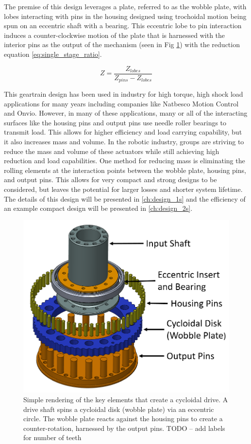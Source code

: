 The premise of this design leverages a plate, referred to as the wobble plate, with lobes interacting with pins in the housing designed using trochoidal motion being spun on an eccentric shaft with a bearing.
This eccentric lobe to pin interaction induces a counter-clockwise motion of the plate that is harnessed with the interior pins as the output of the mechanism (seen in Fig \ref{fig:cycloid_cartoon}) with the reduction equation \ref{eq:single_stage_ratio}.

\begin{equation} \label{eq:single_stage_ratio}
Z = \frac{Z_{lobes}} {Z_{pins} - Z_{lobes}}
\end{equation}

This geartrain design has been used in industry for high torque, high shock load applications for many years including companies like Natbesco Motion Control and Onvio.
However, in many of these applications, many or all of the interacting surfaces like the housing pins and output pins use needle roller bearings to transmit load.
This allows for higher efficiency and load carrying capability, but it also increases mass and volume.
In the robotic industry, groups are striving to reduce the mass and volume of these actuators while still achieving high reduction and load capabilities.
One method for reducing mass is eliminating the rolling elements at the interaction points between the wobble plate, housing pins, and output pins.
This allows for very compact and strong designs to be considered, but leaves the potential for larger losses and shorter system lifetime. The details of this design will be presented in \ref{ch:design_1s} and the efficiency of an example compact design will be presented in \ref{ch:design_2s}. 

\begin{figure}[!b]
   \centering
   \includegraphics[width=0.60\linewidth]{fig/cycloid_cartoon_v2}
   \caption{Simple rendering of the key elements that create a cycloidal drive.
   A drive shaft spins a cycloidal disk (wobble plate) via an eccentric circle.
   The wobble plate reacts against the housing pins to create a counter-rotation, harnessed by the output pins. TODO -- add labels for number of teeth}
   \label{fig:cycloid_cartoon}
\end{figure}

